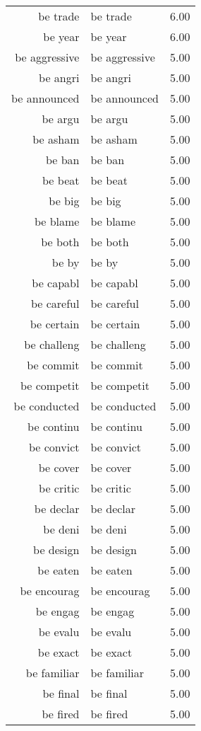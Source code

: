 \begin{table}[ht]
\begin{tabular}{rlr}
  be trade & be trade & 6.00 \\ 
  be year & be year & 6.00 \\ 
  be aggressive & be aggressive & 5.00 \\ 
  be angri & be angri & 5.00 \\ 
  be announced & be announced & 5.00 \\ 
  be argu & be argu & 5.00 \\ 
  be asham & be asham & 5.00 \\ 
  be ban & be ban & 5.00 \\ 
  be beat & be beat & 5.00 \\ 
  be big & be big & 5.00 \\ 
  be blame & be blame & 5.00 \\ 
  be both & be both & 5.00 \\ 
  be by & be by & 5.00 \\ 
  be capabl & be capabl & 5.00 \\ 
  be careful & be careful & 5.00 \\ 
  be certain & be certain & 5.00 \\ 
  be challeng & be challeng & 5.00 \\ 
  be commit & be commit & 5.00 \\ 
  be competit & be competit & 5.00 \\ 
  be conducted & be conducted & 5.00 \\ 
  be continu & be continu & 5.00 \\ 
  be convict & be convict & 5.00 \\ 
  be cover & be cover & 5.00 \\ 
  be critic & be critic & 5.00 \\ 
  be declar & be declar & 5.00 \\ 
  be deni & be deni & 5.00 \\ 
  be design & be design & 5.00 \\ 
  be eaten & be eaten & 5.00 \\ 
  be encourag & be encourag & 5.00 \\ 
  be engag & be engag & 5.00 \\ 
  be evalu & be evalu & 5.00 \\ 
  be exact & be exact & 5.00 \\ 
  be familiar & be familiar & 5.00 \\ 
  be final & be final & 5.00 \\ 
  be fired & be fired & 5.00 \\ 

\end{tabular}
\end{table}
